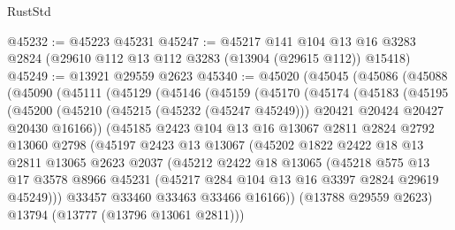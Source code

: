 \begin{lexlean}{RustStd}
\begin{coremodule}
@45232 := @45223 @45231
@45247 := @45217
    @141
    @104
    @13
    @16
    @3283
    @2824
    (@29610 @112 @13 @112 @3283 (@13904 (@29615 @112)) @15418)
@45249 := @13921 @29559 @2623
@45340 := @45020
    (@45045
      (@45086
        (@45088
          (@45090
            (@45111
              (@45129
                (@45146
                  (@45159
                    (@45170
                      (@45174
                        (@45183
                          (@45195
                            (@45200
                              (@45210
                                (@45215 (@45232 (@45247 @45249)))
                                @20421
                                @20424
                                @20427
                                @20430
                                @16166))
                            (@45185
                              @2423
                              @104
                              @13
                              @16
                              @13067
                              @2811
                              @2824
                              @2792
                              @13060
                              @2798
                              (@45197
                                @2423
                                @13
                                @13067
                                (@45202
                                  @1822
                                  @2422
                                  @18
                                  @13
                                  @2811
                                  @13065
                                  @2623
                                  @2037
                                  (@45212
                                    @2422
                                    @18
                                    @13065
                                    (@45218
                                      @575
                                      @13
                                      @17
                                      @3578
                                      @8966
                                      @45231
                                      (@45217 @284 @104 @13 @16 @3397 @2824 @29619 @45249)))
                                  @33457
                                  @33460
                                  @33463
                                  @33466
                                  @16166))
                              (@13788 @29559 @2623)
                              @13794
                              (@13777 (@13796 @13061 @2811)))

\end{coremodule}
\end{lexlean}
